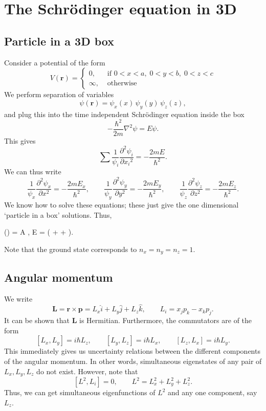 \documentclass[11pt]{article}
\newcommand\ve[1]{\boldsymbol{#1}}
\newcommand\pp[3][]{\frac{\partial^{#1}{#2}}{\partial {#3}^{#1}}}
\newcommand\lapl[1]{\nabla^2 #1}
\def\vr{\ve{r}}
\def\vp{\ve{p}}
\def\vL{\ve{L}}
\theoremstyle{definition}
\newenvironment{boxedeq*}%
    {\begin{equationbox}\begin{equation*}}%
    {\end{equation*}\end{equationbox}}
\theoremstyle{remark}
\numberwithin{equation}{section}
\begin{document}
    \section{The Schr\"odinger equation in 3D}
    \subsection{Particle in a 3D box}
    Consider a potential of the form \[
        V(\ve{r}) = \begin{cases}
            0, &\text{ if } 0 < x < a,\; 0 < y < b,\; 0 < z < c \\
            \infty, &\text{ otherwise }
        \end{cases}
    \] We perform separation of variables \[
        \psi(\ve{r}) = \psi_x(x)\,\psi_y(y)\,\psi_z(z),
    \] and plug this into the time independent Schr\"odinger equation inside the box
    \[
        -\frac{\hbar^2}{2m}\lapl{\psi} = E\psi.
    \] This gives \[
        \sum \frac{1}{\psi_i}\pp[2]{\psi_i}{x_i} = -\frac{2mE}{\hbar^2}.
    \] We can thus write \[
        \frac{1}{\psi_x}\pp[2]{\psi_x}{x} = -\frac{2mE_x}{\hbar^2}, \qquad
        \frac{1}{\psi_y}\pp[2]{\psi_y}{y} = -\frac{2mE_y}{\hbar^2}, \qquad
        \frac{1}{\psi_z}\pp[2]{\psi_z}{z} = -\frac{2mE_z}{\hbar^2}.
    \] We know how to solve these equations; these just give the one dimensional
    `particle in a box' solutions. Thus, 
    \begin{boxedeq*}
        \psi(\ve{r}) = A \sin{}\sin{}\sin{}, \qquad 
        E = \left( +  +
        \right).
    \end{boxedeq*}
    Note that the ground state corresponds to $n_x = n_y = n_z = 1$.
    
    \subsection{Angular momentum}
    We write \[
        \vL = \vr \times \vp = L_x\hat{i} + L_y\hat{j} + L_z\hat{k}, \qquad
        L_i = x_jp_k - x_kp_j.
    \] It can be shown that $\vL$ is Hermitian. Furthermore, the commutators are of
    the form \[
        [L_x, L_y] = i\hbar L_z, \qquad 
        [L_y, L_z] = i\hbar L_x, \qquad 
        [L_z, L_x] = i\hbar L_y.
    \] This immediately gives us uncertainty relations between the different
    components of the angular momentum. In other words, simultaneous eigenstates of
    any pair of $L_x, L_y, L_z$ do not exist. However, note that \[
        [L^2, L_i] = 0, \qquad
        L^2 = L_x^2 + L_y^2 + L_z^2.
    \] Thus, we can get simultaneous eigenfunctions of $L^2$ and any one component,
    say $L_z$.
\end{document}
